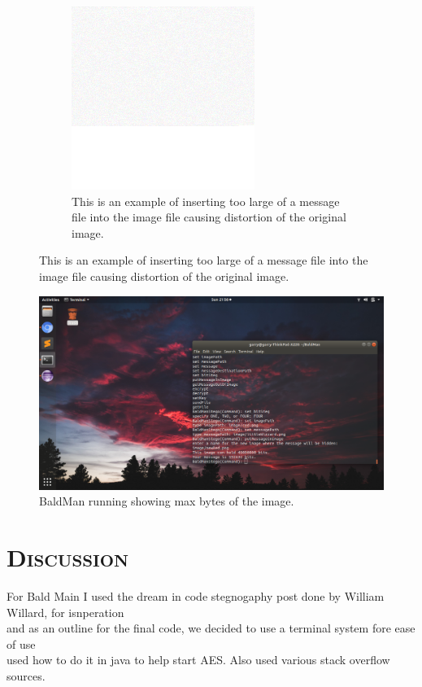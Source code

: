 \documentclass[12pt]{article}
\begin{document}
	\begin{figure}[h]
		\centering
                \begin{subfigure}[t]{0.3\textwidth}
                    \includegraphics[keepaspectratio=true, width=0.8\linewidth]{image/bloob.png}
                    \caption{This is an example of inserting too large of a message file into the image file causing distortion of the original image.}
                \end{subfigure}
	\end{figure}
        \begin{figure}[h]
                    \centering
                    \includegraphics[keepaspectratio=true, width=0.8\linewidth]{screenshot.png}
                    \caption{BaldMan running showing max bytes of the image.}
            \end{figure}
	
	
	\section[Sources]{\Large{}\selectfont\scshape Discussion}
        For Bald Main I used the dream in code stegnogaphy post done by William Willard, for isnperation\\
        and as an outline for the final code, we decided to use a terminal system fore ease of use\\
        used how to do it in java to help start AES. Also used various stack overflow sources.
        
\end{document}
